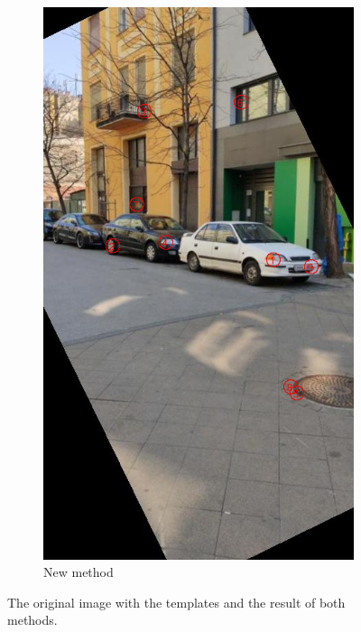 \begin{figure}[tbp]
\begin{subfigure}{0.45\textwidth}
    \includegraphics[width=\textwidth, trim=0 200 0 80, clip]{figures/templates/new.png}
	\caption{New method}
    \end{subfigure}
    \caption{The original image with the templates and the result of both methods.}
    \label{fig:template_match}
\end{figure}
